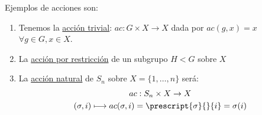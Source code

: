 \begin{ejemplo}
    Ejemplos de acciones son:
    \begin{enumerate}
        \item Tenemos la \underline{acción trivial}: $ac:G\times X \to X$ dada por $ac(g,x) = x$ $\forall g\in G, x\in X$.
        \item La \underline{acción por restricción} de un subgrupo $H<G$ sobre $X$
            \begin{figure}[H]
                \centering
            \end{figure}
        \item La \underline{acción natural} de $S_n$ sobre $X = \{1,\ldots,n\}$ será:
            \begin{gather*}
                ac:S_n\times X \to X \\
                (\sigma,i) \longmapsto ac(\sigma,i) = \prescript{\sigma}{}{i} = \sigma(i)
            \end{gather*}
    \end{enumerate}
\end{ejemplo}

